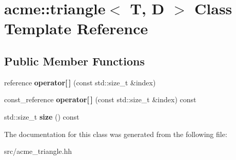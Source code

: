 \hypertarget{classacme_1_1triangle}{}\section{acme\+:\+:triangle$<$ T, D $>$ Class Template Reference}
\label{classacme_1_1triangle}
\subsection*{Public Member Functions}
\begin{DoxyCompactItemize}
\item 
\mbox{\label{classacme_1_1triangle_af7c75bec9bd564e85c75ca2ad6b91d7a}} 
reference {\bfseries operator\mbox{[}$\,$\mbox{]}} (const std\+::size\+\_\+t \&index)
\item 
\mbox{\label{classacme_1_1triangle_a29febf3fe6ff8754b8ba5ca7e623850a}} 
const\+\_\+reference {\bfseries operator\mbox{[}$\,$\mbox{]}} (const std\+::size\+\_\+t \&index) const
\item 
\mbox{\label{classacme_1_1triangle_a14f46edd169af3f4ce2aad8b23be4d63}} 
std\+::size\+\_\+t {\bfseries size} () const
\end{DoxyCompactItemize}


The documentation for this class was generated from the following file\+:\begin{DoxyCompactItemize}
\item 
src/acme\+\_\+triangle.\+hh\end{DoxyCompactItemize}
